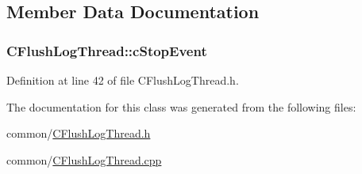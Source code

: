 \subsection{\-Member \-Data \-Documentation}
\hypertarget{class_c_flush_log_thread_a11b22bac683093063d370dce191cfe21}{
\subsubsection[{c\-Stop\-Event}]{ {\bf \-C\-Flush\-Log\-Thread\-::c\-Stop\-Event}}}\label{class_c_flush_log_thread_a11b22bac683093063d370dce191cfe21}


\-Definition at line 42 of file \-C\-Flush\-Log\-Thread.\-h.



\-The documentation for this class was generated from the following files\-:\begin{DoxyCompactItemize}
\item 
common/\hyperlink{_c_flush_log_thread_8h}{\-C\-Flush\-Log\-Thread.\-h}\item 
common/\hyperlink{_c_flush_log_thread_8cpp}{\-C\-Flush\-Log\-Thread.\-cpp}\end{DoxyCompactItemize}
